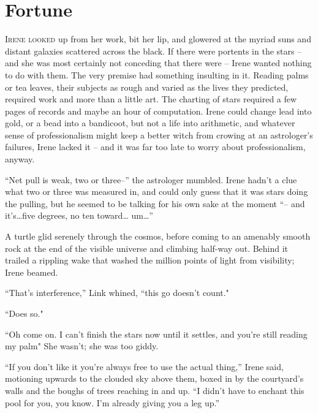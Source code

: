 \documentclass[../FGP.tex]{subfiles}
\begin{document}
\section{Fortune}
\begin{fragment}
\noindent \label{sec:fortune}\lettrine[lines=3,loversize=0.039]{I}{rene looked} up from her work, bit her lip, and glowered at the myriad suns and distant galaxies scattered across the black. If there were portents in the stars -- and she was most certainly not conceding that there were -- Irene wanted nothing to do with them. The very premise had something insulting in it. Reading palms or tea leaves, their subjects as rough and varied as the lives they predicted, required work and more than a little art. The charting of stars required a few pages of records and maybe an hour of computation. Irene could change lead into gold, or a bead into a bandicoot, but not a life into arithmetic, and whatever sense of professionalism might keep a better witch from crowing at an astrologer's failures, Irene lacked it -- and it was far too late to worry about professionalism, anyway.

``Net pull is weak, two or three--'' the astrologer mumbled. Irene hadn't a clue what two or three was measured in, and could only guess that it was stars doing the pulling, but he seemed to be talking for his own sake at the moment ``-- and it's\ldots five degrees, no ten toward{\ldots} um{\ldots}''

A turtle glid\reversemarginpar{} serenely through the cosmos, before coming to an amenably smooth rock at the end of the visible universe and climbing half-way out. Behind it trailed a rippling wake that washed the million points of light from visibility; Irene beamed.

\normalmarginpar``That's interference,'' Link whined, ``this go doesn't count."  

``Does so." 

``Oh come on. I can't finish the stars now until it settles, and you're still reading my palm" She wasn't; she was too giddy.

``If you don't like it you're always free to use the actual thing,'' Irene said, motioning upwards to the clouded sky above them, boxed in by the courtyard's walls and the boughs of trees reaching in and up. ``I didn't have to enchant this pool for you, you know. I'm already giving you a leg up.''


\end{fragment}
\end{document}
